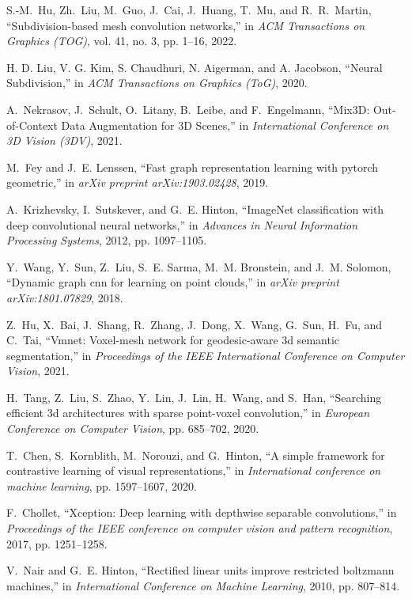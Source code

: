 \begin{thebibliography}{1}
S.-M.~Hu, Zh.~Liu, M.~Guo, J.~Cai, J.~Huang, T.~Mu, and R.~R.~Martin,
``Subdivision-based mesh convolution networks,''
 in \emph{ACM Transactions on Graphics (TOG)},
  vol. 41, no. 3, pp. 1--16, 2022.

H. D. Liu, V. G. Kim, S. Chaudhuri, N. Aigerman, and A. Jacobson, ``Neural Subdivision,'' in \emph{
ACM Transactions on Graphics (ToG)}, 2020.

A.~Nekrasov, J.~Schult, O.~Litany, B.~Leibe, and F.~Engelmann, 
  ``{Mix3D: Out-of-Context Data Augmentation for 3D Scenes},''
 in \emph{International Conference on 3D Vision (3DV)}, 2021. 

M.~Fey and J.~E. Lenssen, ``Fast graph representation learning with pytorch
  geometric,'' in \emph{arXiv preprint arXiv:1903.02428}, 2019.

A.~Krizhevsky, I.~Sutskever, and G.~E. Hinton, ``{ImageNet} classification with
  deep convolutional neural networks,'' in \emph{Advances in Neural Information
  Processing Systems}, 2012, pp. 1097--1105.

Y.~Wang, Y.~Sun, Z.~Liu, S.~E. Sarma, M.~M. Bronstein, and J.~M. Solomon,
  ``Dynamic graph cnn for learning on point clouds,'' in \emph{arXiv preprint
  arXiv:1801.07829}, 2018.

Z.~Hu, X.~Bai, J.~Shang, R.~Zhang, J.~Dong, X.~Wang, G.~Sun, H.~Fu, and C.~Tai, ``Vmnet: Voxel-mesh network for geodesic-aware 3d semantic
  segmentation,'' in
  \emph{Proceedings of the IEEE International Conference on Computer Vision}, 2021.

H.~Tang, Z.~Liu, S.~Zhao, Y.~Lin, J.~Lin, H.~Wang, and S.~Han, ``Searching
  efficient 3d architectures with sparse point-voxel convolution,'' in
  \emph{European Conference on Computer Vision}, pp. 685--702, 2020.

T.~Chen, S.~Kornblith, M.~Norouzi, and G.~Hinton, ``A simple framework for
  contrastive learning of visual representations,'' in \emph{International
  conference on machine learning},
  pp. 1597--1607, 2020.

F.~Chollet, ``Xception: Deep learning with depthwise separable convolutions,''
  in \emph{Proceedings of the IEEE conference on computer vision and pattern
  recognition}, 2017, pp. 1251--1258.

V.~Nair and G.~E. Hinton, ``Rectified linear units improve restricted boltzmann
  machines,'' in \emph{International Conference on Machine Learning}, 2010, pp. 807--814.


\end{thebibliography}
